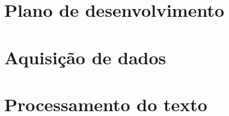 \section{Plano de desenvolvimento}

\section{Aquisição de dados}


\section{Processamento do texto}
